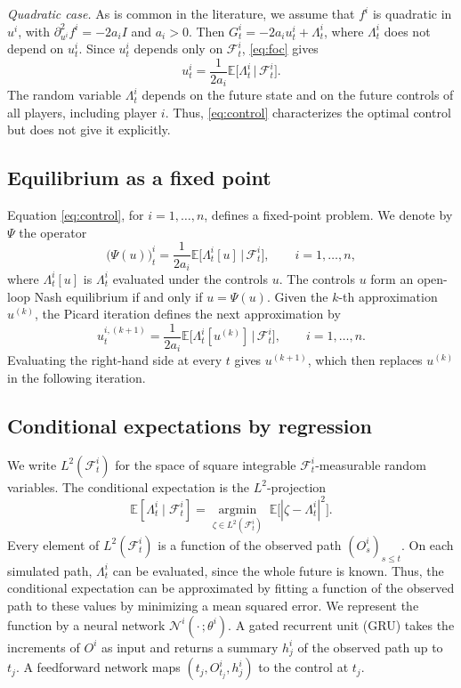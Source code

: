 \documentclass[11pt]{article}
\newcommand{\E}{\mathbb{E}}
\newcommand{\F}{\mathcal{F}}
\begin{document}
\textit{Quadratic case.} As is common in the literature, we assume that $f^i$ is quadratic in $u^i$, with $\partial^2_{u^i} f^i = - 2 a_i I$ and $a_i > 0$. Then $G^i_t = - 2 a_i u^i_t + \Lambda^i_t$, where $\Lambda^i_t$ does not depend on $u^i_t$. Since $u^i_t$ depends only on $\F^i_t$, \eqref{eq:foc} gives
\begin{equation}
  \label{eq:control}
  u^i_t = \frac{1}{2 a_i} \E\big[ \Lambda^i_t \,\big|\, \F^i_t \big] .
\end{equation}
The random variable $\Lambda^i_t$ depends on the future state and on the future controls of all players, including player $i$. Thus, \eqref{eq:control} characterizes the optimal control but does not give it explicitly.

\subsection{Equilibrium as a fixed point}
\label{sec:fixed-point}

Equation \eqref{eq:control}, for $i = 1, \dots, n$, defines a fixed-point problem. We denote by $\Psi$ the operator
\begin{equation}
  \label{eq:psi}
  \big( \Psi(u) \big)^i_t = \frac{1}{2 a_i} \E\big[ \Lambda^i_t[u] \,\big|\, \F^i_t \big] , \qquad i = 1, \dots, n ,
\end{equation}
where $\Lambda^i_t[u]$ is $\Lambda^i_t$ evaluated under the controls $u$. The controls $u$ form an open-loop Nash equilibrium if and only if $u = \Psi(u)$. Given the $k$-th approximation $u^{(k)}$, the Picard iteration defines the next approximation by
\begin{equation*}
  u^{i,(k+1)}_t = \frac{1}{2 a_i} \E\big[ \Lambda^i_t[u^{(k)}] \,\big|\, \F^i_t \big] , \qquad i = 1, \dots, n .
\end{equation*}
Evaluating the right-hand side at every $t$ gives $u^{(k+1)}$, which then replaces $u^{(k)}$ in the following iteration.

\subsection{Conditional expectations by regression}
\label{sec:regression}

We write $L^2(\F^i_t)$ for the space of square integrable $\F^i_t$-measurable random variables. The conditional expectation is the $L^2$-projection
\begin{equation}
  \label{eq:projection}
  \E[\Lambda^i_t \mid \F^i_t] = \operatorname*{argmin}_{\zeta \in L^2(\F^i_t)} \; \E\big[ |\zeta - \Lambda^i_t|^2 \big] .
\end{equation}
Every element of $L^2(\F^i_t)$ is a function of the observed path $(O^i_s)_{s \le t}$. On each simulated path, $\Lambda^i_t$ can be evaluated, since the whole future is known. Thus, the conditional expectation can be approximated by fitting a function of the observed path to these values by minimizing a mean squared error. We represent the function by a neural network $\mathcal{N}^i(\cdot\,; \theta^i)$. A gated recurrent unit (GRU) takes the increments of $O^i$ as input and returns a summary $h^i_j$ of the observed path up to $t_j$. A feedforward network maps $(t_j, O^i_{t_j}, h^i_j)$ to the control at $t_j$.
\end{document}
